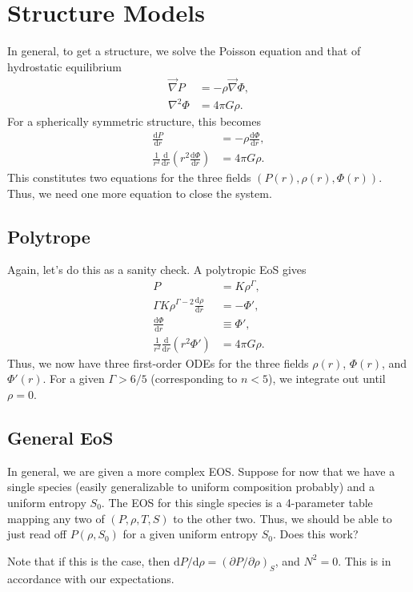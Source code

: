 \documentclass[11pt,
        usenames, %
        twocolumn,
        landscape,
        dvipsnames %
    ]{article}
\newcommand*{\rd}[2]{\frac{\mathrm{d}#1}{\mathrm{d}#2}}
\newcommand*{\rdil}[2]{\mathrm{d}#1 / \mathrm{d}#2}
\newcommand*{\pdil}[2]{\partial#1 / \partial#2}
\newcommand*{\p}[1]{\left(#1\right)}
\begin{document}
\section{Structure Models}

In general, to get a structure, we solve the Poisson equation and that of
hydrostatic equilibrium
\begin{align}
    \vec{\nabla}P &= -\rho \vec{\nabla}\Phi,\\
    \nabla^2\Phi &= 4\pi G\rho.
\end{align}
For a spherically symmetric structure, this becomes
\begin{align}
    \rd{P}{r} &= -\rho \rd{\Phi}{r},\\
    \frac{1}{r^2}\rd{}{r}\p{r^2\rd{\Phi}{r}} &= 4\pi G\rho.
\end{align}
This constitutes two equations for the three fields $\p{P(r), \rho(r),
\Phi(r)}$. Thus, we need one more equation to close the system.

\subsection{Polytrope}

Again, let's do this as a sanity check. A polytropic EoS gives
\begin{align}
    P &= K\rho^\Gamma,\\
    \Gamma K\rho^{\Gamma - 2}\rd{\rho}{r} &= -\Phi',\\
    \rd{\Phi}{r} &\equiv \Phi',\\
    \frac{1}{r^2}\rd{}{r}\p{r^2\Phi'} &= 4\pi G\rho.
\end{align}
Thus, we now have three first-order ODEs for the three fields $\rho(r)$,
$\Phi(r)$, and $\Phi'(r)$. For a given $\Gamma > 6/5$ (corresponding to $n <
5$), we integrate out until $\rho = 0$.

\subsection{General EoS}

In general, we are given a more complex EOS\@. Suppose for now that we have a
single species (easily generalizable to uniform composition probably) and a
uniform entropy $S_0$. The EOS for this single species is a 4-parameter table
mapping any two of $\p{P, \rho, T, S}$ to the other two. Thus, we should be able
to just read off $P\p{\rho, S_0}$ for a given uniform entropy $S_0$. Does this
work?

Note that if this is the case, then $\rdil{P}{\rho} = (\pdil{P}{\rho})_S$, and
$N^2 = 0$. This is in accordance with our expectations.
\end{document}
